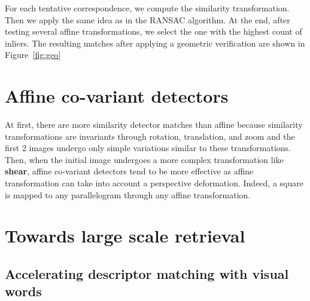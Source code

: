 \documentclass{article}
\begin{document}

For each tentative correspondence, we compute the similarity transformation. Then we apply the same idea as in the RANSAC algorithm. At the end, after testing several affine transformations, we select the one with the highest count of inliers. The resulting matches after applying a geometric verification are shown in Figure~\ref{fig:geo}


\section{Affine co-variant detectors}

At first, there are more similarity detector matches than affine because similarity transformations are invariants through rotation, translation, and zoom and the first 2 images undergo only simple variations similar to these transformations. Then, when the initial image undergoes a more complex transformation like \textbf{shear}, affine co-variant detectors tend to be more effective as affine transformation can take into account a perspective deformation. Indeed, a square is mapped to any parallelogram through any affine transformation.




\section{Towards large scale retrieval}
\subsection{Accelerating descriptor matching with visual words}
\end{document}
